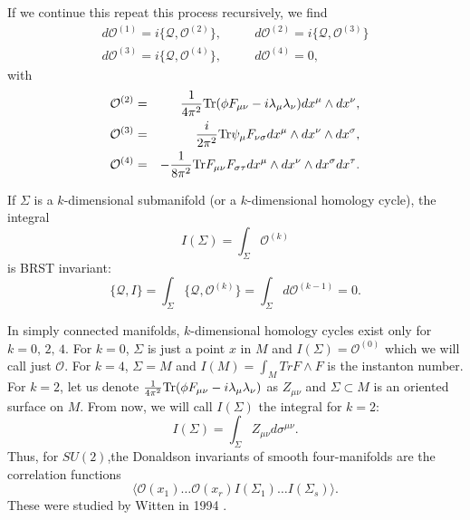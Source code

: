\documentclass[12pt, onecolumn]{article}
\begin{document}
If we continue this repeat this process recursively, we find 
\begin{eqnarray}
d\mathcal{O}^{(1)}=i\{\mathcal{Q},\mathcal{O}^{(2)}\},\,\,\,&&\,\,\, d\mathcal{O}^{(2)}=i\{\mathcal{Q},\mathcal{O}^{(3)}\} \nonumber \\
d\mathcal{O}^{(3)}=i\{\mathcal{Q},\mathcal{O}^{(4)}\},\,\,\,&&\,\,\, d\mathcal{O}^{(4)}=0,
\end{eqnarray} with 
\begin{eqnarray}
\mathcal{O}^{(2)}&=&\frac{1}{4\pi^2}{\rm Tr} (\phi F_{\mu\nu} - i \lambda_\mu\lambda_\nu)dx^\mu\wedge dx^\nu, \nonumber \\ \mathcal{O}^{(3)}&=&\frac{i}{2\pi^2}{\rm Tr} \psi_\mu F_{\nu\sigma}dx^\mu\wedge dx^\nu\wedge dx^\sigma, \nonumber \\ \mathcal{O}^{(4)}&=&-\frac{1}{8\pi^2}{\rm Tr}F_{\mu\nu}F_{\sigma \tau}dx^\mu\wedge dx^\nu\wedge dx^\sigma dx^\tau.
\end{eqnarray}

If $\Sigma$ is a $k$-dimensional submanifold (or a $k$-dimensional homology cycle), the integral 
\begin{equation}
I(\Sigma)=\int_\Sigma \mathcal{O}^{(k)}
\end{equation} is BRST invariant:
\begin{equation}
\{\mathcal{Q},I\}=\int_\Sigma\{\mathcal{Q},\mathcal{O}^{(k)}\}=\int_\Sigma d \mathcal{O}^{(k-1)} = 0.
\end{equation}

In simply connected manifolds, $k$-dimensional homology cycles exist only for $k=0,\,2,\,4.$ For $k=0$, $\Sigma$ is just  a point $x$ in $M$ and $I(\Sigma)= \mathcal{O}^{(0)}$ which we will call just $\mathcal{O}$. For $k=4$, $\Sigma=M$ and $I(M)=\int_M{Tr}F \wedge F $ is the instanton number. For $k=2$, let us denote  $\frac{1}{4\pi^2}{\rm Tr} (\phi F_{\mu\nu} - i \lambda_\mu\lambda_\nu)$ as $Z_{\mu\nu}$ and $\Sigma\subset M$ is an oriented surface on $M$. From now, we will call $I(\Sigma)$ the integral for $k=2$:$$I(\Sigma) =\int_\Sigma Z_{\mu\nu}d\sigma^{\mu\nu}.$$ Thus, for $SU(2)$,the Donaldson invariants of smooth four-manifolds are the correlation functions 
\begin{equation}
\langle \mathcal{O}(x_1)\ldots\mathcal{O}(x_r)I(\Sigma_1)\ldots I(\Sigma_s)\rangle.
\end{equation} These were studied by Witten in 1994 \cite{Witten_1994}.
\end{document}
